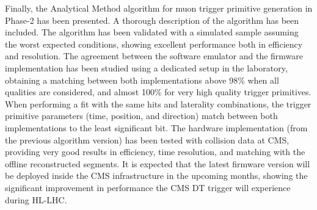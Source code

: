 \documentclass[main.tex]{subfiles}
\begin{document}
Finally, the Analytical Method algorithm for muon trigger primitive generation in Phase-2 has been presented. A thorough description of the algorithm has been included. The algorithm has been validated with a simulated sample assuming the worst expected conditions, showing excellent performance both in efficiency and resolution. The agreement between the software emulator and the firmware implementation has been studied using a dedicated setup in the laboratory, obtaining a matching between both implementations above 98\% when all qualities are considered, and almost 100\% for very high quality trigger primitives. When performing a fit with the same hits and laterality combinations, the trigger primitive parameters (time, position, and direction) match between both implementations to the least significant bit. The hardware implementation (from the previous algorithm version) has been tested with collision data at CMS, providing very good results in efficiency, time resolution, and matching with the offline reconstructed segments. It is expected that the latest firmware version will be deployed inside the CMS infrastructure in the upcoming months, showing the significant improvement in performance the CMS DT trigger will experience during HL-LHC.
\end{document}
